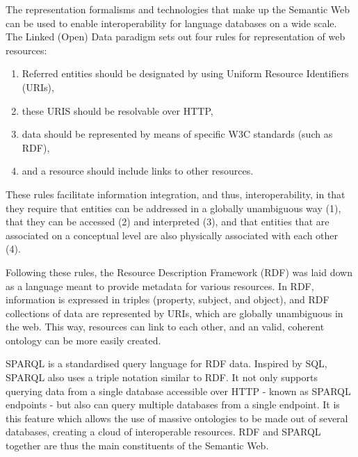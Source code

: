 The representation formalisms and technologies that make up the Semantic Web can be used to enable interoperability for language databases on a wide scale. The Linked (Open) Data paradigm \citep{bernersLee2006_linkeddata} sets out four rules for representation of web resources: 
\begin{enumerate}\item Referred entities should be designated by using Uniform Resource Identifiers (URIs),
\item these URIS should be resolvable over HTTP,
\item data should be represented by means of specific W3C standards (such as RDF),
\item and a resource should include links to other resources. \end{enumerate}
These rules facilitate information integration, and thus, interoperability, in that they require that entities can be addressed in a globally unambiguous way (1), that they can be accessed (2) and interpreted (3), and that entities that are associated on a conceptual level are also physically associated with each other (4). \cite{ChiarcosLOD} 


Following these rules, the Resource Description Framework (RDF) was laid down as a language meant to provide metadata for various resources. In RDF, information is expressed in triples (property, subject, and object), and RDF collections of data are represented by URIs, which are globally unambiguous in the web. This way, resources can link to each other, and an valid, coherent ontology can be more easily created. 

SPARQL \cite{prud2008sparql} is a standardised query language for RDF data. Inspired by SQL, SPARQL also uses a triple notation similar to RDF. It not only supports querying data from a single database accessible over HTTP - known as SPARQL endpoints - but also can query multiple databases from a single endpoint. It is this feature which allows the use of massive ontologies to be made out of several databases, creating a cloud of interoperable resources. RDF and SPARQL together are thus the main constituents of the Semantic Web. 
